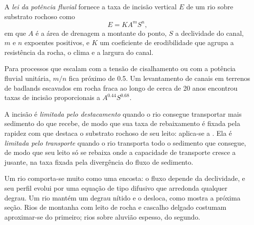 \begin{definition}\label{def:b3:quantitative-geomorphology:stream-power}
A \emph{lei da potência fluvial} fornece a taxa de
incisão vertical $E$ de um rio sobre substrato rochoso como
\[
E = K A^m S^n ,
\]
em que $A$ é a área de drenagem a montante do ponto, $S$ a declividade do
canal, $m$ e $n$ expoentes positivos, e $K$ um coeficiente de erodibilidade
que agrupa a resistência da rocha, o clima e a largura do canal.
\end{definition}

Para processos que escalam com a tensão de cisalhamento ou com a potência fluvial unitária,
$m/n$ fica próximo de 0.5. Um levantamento de canais em terrenos de badlands escavados em rocha fraca ao longo de
cerca de 20 anos encontrou taxas de incisão proporcionais a $A^{0.44}S^{0.68}$.

\begin{definition}\label{def:b3:quantitative-geomorphology:limited}
A incisão é \emph{limitada pelo destacamento}
quando o rio consegue transportar mais sedimento do que recebe, de modo que sua
taxa de rebaixamento é fixada pela rapidez com que destaca o substrato rochoso de seu leito: aplica-se a
. Ela é
\emph{limitada pelo transporte} quando o rio
transporta todo o sedimento que consegue, de modo que seu leito só se rebaixa onde a
capacidade de transporte cresce a jusante, na taxa fixada pela divergência do
fluxo de sedimento.
\end{definition}

Um rio  comporta-se muito como uma encosta: o fluxo depende
da declividade, e seu perfil evolui por uma equação de tipo difusivo que arredonda
qualquer degrau. Um rio  mantém um degrau nítido e o desloca,
como mostra a próxima seção. Rios de montanha com leito de rocha e cascalho delgado
costumam aproximar-se do primeiro; rios sobre aluvião espesso, do
segundo.

